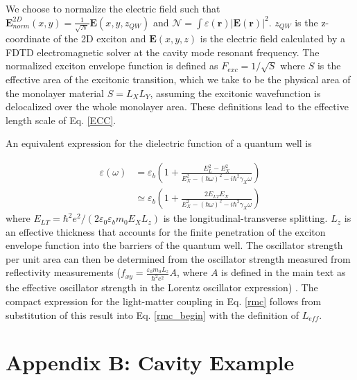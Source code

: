 \documentclass{achemso}
\begin{document}
We choose to normalize the electric field such that $\mathbf{E}_{norm}^{2D}(x,y) = \frac{1}{\mathcal{\sqrt{N}}}\mathbf{E}(x,y,z_{QW})$ and $\mathcal{N} = \int \varepsilon (\mathbf{r}) \left| \mathbf{E} (\mathbf{r}) \right|^2$. $z_{QW}$ is the z-coordinate of the 2D exciton and $\mathbf{E}(x,y,z)$ is the electric field calculated by a FDTD electromagnetic solver at the cavity mode resonant frequency. The normalized exciton envelope function is defined as $F_{exc} = 1/\sqrt{S}$ where $S$ is the effective area of the excitonic transition, which we take to be the physical area of the monolayer material $S = L_{X} L_{Y}$, assuming the excitonic wavefunction is delocalized over the whole monolayer area. These definitions lead to the effective length scale of Eq. \ref{ECC}.

An equivalent expression for the dielectric function of a quantum well is \cite{andreani_exciton-polaritons_2013}

\begin{align}
	\varepsilon (\omega) & = \varepsilon_{b} \left( 1 + \frac{E_{L}^2 - E_{X}^2}{E_{X}^2 - (\hbar \omega)^2 - i \hbar^2 \gamma_{X} \omega} \right) \\
	& \simeq \varepsilon_{b} \left( 1 + \frac{2 E_{LT} E_{X}}{E_{X}^2 - (\hbar \omega)^2 - i \hbar^2 \gamma_{X} \omega} \right)
\end{align}
where $E_{LT} = \hbar^2 e^2 / (2 \varepsilon_{0} \varepsilon_{b} m_{0} E_{X} L_{z})$ is the longitudinal-transverse splitting. $L_{z}$ is an effective thickness that accounts for the finite penetration of the exciton envelope function into the barriers of the quantum well. The oscillator strength per unit area can then be determined from the oscillator strength measured from reflectivity measurements ($f_{xy} = \frac{\varepsilon_{0} m_{0} L_{z}}{\hbar^2 e^2} A$, where $A$ is defined in the main text as the effective oscillator strength in the Lorentz oscillator expression) \cite{lundt_monolayered_2016}. The compact expression for the light-matter coupling in Eq. \ref{rmc} follows from substitution of this result into Eq. \ref{rmc_begin} with the definition of $L_{eff}$.

\section*{Appendix B: Cavity Example}
\setcounter{equation}{0}
\renewcommand{\theequation}{B\arabic{equation}}
\end{document}
